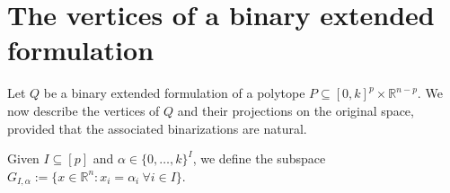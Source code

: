 \documentclass[11pt,a4paper]{article}
\newtheorem{observation}[theorem]{Observation}
\newcommand{\R}{\mathbb{R}}
\newcommand{\1}{\textbf{1}}
\newcommand\manuel[1]{\textcolor{LimeGreen}{\textbf{ MA:  #1}}}
\newcommand\michele[1]{\textcolor{blue}{\textbf{ MC:  #1}}}
\begin{document}




\section{The vertices of a binary extended formulation}\label{sec:vertices}



Let $Q$ be a binary extended formulation of a polytope $P\subseteq [0,k]^p\times \R^{n-p}$. We now  describe the vertices of $Q$ and their projections on the original space, provided that the associated binarizations are natural. %



 Given %
$I\subseteq [p]$  and $\alpha\in \{0,\dots,k\}^{I}$, we define the subspace $G_{I,\alpha}:=\{x\in \R^n:x_i=\alpha_{i}\:\forall i\in I\}$.
\end{document}
